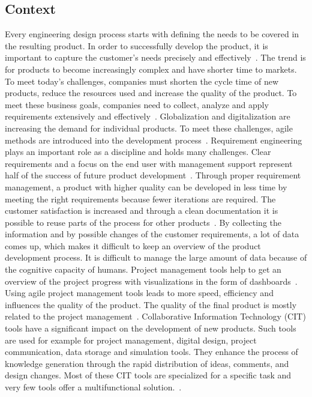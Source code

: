     \subsection*{Context}
    Every engineering design process starts with defining the needs to be covered in the resulting product. In order to successfully develop the product, it is important to capture the customer's needs precisely and effectively~\cite{liu2012scenario}.
    The trend is for products to become increasingly complex and have shorter time to markets.
    To meet today's challenges, companies must shorten the cycle time of new products, reduce the resources used and increase the quality of the product. To meet these business goals, companies need to collect, analyze and apply requirements extensively and effectively~\cite{Ahti2005}. Globalization and digitalization are increasing the demand for individual products. To meet these challenges, agile methods are introduced into the development process~\cite{HEIMICKE2021786}. Requirement engineering plays an important role as a discipline and holds many challenges. Clear requirements and a focus on the end user with management support represent half of the success of future product development~\cite{6226784}.
    Through proper requirement management, a product with higher quality can be developed in less time by meeting the right requirements because fewer iterations are required. The customer satisfaction is increased and through a clean documentation it is possible to reuse parts of the process for other products~\cite{BAXTER2008585}.
    By collecting the information and by possible changes of the customer requirements, a lot of data comes up, which makes it difficult to keep an overview of the product development process. It is difficult to manage the large amount of data because of the cognitive capacity of humans. Project management tools help to get an overview of the project progress with visualizations in the form of dashboards~\cite{RICHTER2020271}.
    Using agile project management tools leads to more speed, efficiency and influences the quality of the product. The quality of the final product is mostly related to the project management~\cite{ozkan2019agile}. 
    Collaborative Information Technology (CIT) tools have a significant impact on the development of new products. Such tools are used for example for project management, digital design, project communication, data storage and simulation tools. They enhance the process of knowledge generation through the rapid distribution of ideas, comments, and design changes. Most of these CIT tools are specialized for a specific task and very few tools offer a multifunctional solution.~\cite{MarionTucker}.
    
